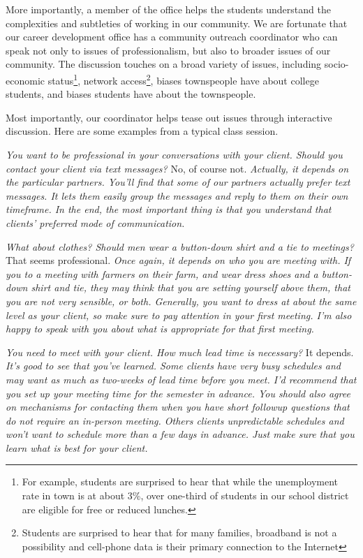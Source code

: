 More importantly, a member of the office helps the students understand
the complexities and subtleties of working in our community.  We
are fortunate that our career development office has a community
outreach coordinator who can speak not only to issues of professionalism,
but also to broader issues of our community.  The discussion touches
on a broad variety of issues, including socio-economic status\footnote{For
example, students are surprised to hear that while the unemployment
rate in town is at about 3\%, over one-third of students in our
school district are eligible for free or reduced lunches.}, network
access\footnote{Students are surprised to hear that for many families,
broadband is not a possibility and cell-phone data is their primary
connection to the Internet}, biases townspeople have about college
students, and biases students have about the townspeople.

Most importantly, our coordinator helps tease out issues through interactive
discussion.  Here are some examples from a typical class session.

\newcommand{\question}[1]{\textsl{#1}}
\newcommand{\answer}[1]{#1}
\newcommand{\followup}[1]{\textsl{#1}}

\question{You want to be professional in your conversations with your client.  Should you contact your client via text messages?}
\answer{No, of course not.}
\followup{Actually, it depends on the particular partners.  You'll find that some of our partners actually prefer text messages.  It lets them easily group the messages and reply to them on their own timeframe.  In the end, the most important thing is that you understand that clients' preferred mode of communication.}

\question{What about clothes?  Should men wear a button-down shirt and a tie to meetings?}
\answer{That seems professional.}
\followup{Once again, it depends on who you are meeting with.  If
you to a meeting with farmers on their farm, and wear dress shoes
and a button-down shirt and tie, they may think that you are setting
yourself above them, that you are not very sensible, or both.
Generally, you want to dress at about the same level as your client,
so make sure to pay attention in your first meeting.  I'm also happy
to speak with you about what is appropriate for that first meeting.}

\question{You need to meet with your client.  How much lead time is necessary?}
\answer{It depends.}
\followup{It's good to see that you've learned.  Some clients have very
busy schedules and may want as much as two-weeks of lead time before
you meet.  I'd recommend that you set up your meeting time for the
semester in advance.  You should also agree on mechanisms for
contacting them when you have short followup questions that do not
require an in-person meeting.  Others clients unpredictable schedules
and won't want to schedule more than a few days in advance.  Just make
sure that you learn what is best for your client.}

